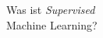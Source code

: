 \documentclass[preview]{standalone}
\begin{document}
\begin{center}
Was ist \textit{Supervised} \\ Machine Learning?
\end{center}
\end{document}
